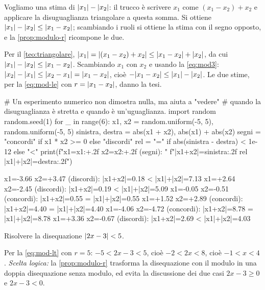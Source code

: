\begin{strategia}
Vogliamo una stima di $\lvert x_{1}\rvert-\lvert x_{2}\rvert$: il trucco è scrivere $x_{1}$ come
$(x_{1}-x_{2})+x_{2}$ e applicare la disuguaglianza triangolare a questa somma. Si
ottiene $\lvert x_{1}\rvert-\lvert x_{2}\rvert\le\lvert x_{1}-x_{2}\rvert$; scambiando i ruoli si ottiene
la stima con il segno opposto, e la \cref{prop:modulo-r} ricompone le due.
\end{strategia}

\begin{dimostrazione}
Per il \cref{teo:triangolare}, $\lvert x_{1}\rvert=\lvert (x_{1}-x_{2})+x_{2}\rvert\le\lvert x_{1}-x_{2}\rvert+\lvert x_{2}\rvert$,
da cui $\lvert x_{1}\rvert-\lvert x_{2}\rvert\le\lvert x_{1}-x_{2}\rvert$. Scambiando $x_{1}$ con $x_{2}$ e
usando la \eqref{eq:mod3}: $\lvert x_{2}\rvert-\lvert x_{1}\rvert\le\lvert x_{2}-x_{1}\rvert=\lvert x_{1}-x_{2}\rvert$,
cioè $-\lvert x_{1}-x_{2}\rvert\le\lvert x_{1}\rvert-\lvert x_{2}\rvert$. Le due stime, per la
\eqref{eq:mod-le} con $r=\lvert x_{1}-x_{2}\rvert$, danno la tesi.
\end{dimostrazione}

\begin{python}
# Un esperimento numerico non dimostra nulla, ma aiuta a "vedere"
# quando la disuguaglianza è stretta e quando è un'uguaglianza.
import random
random.seed(1)
for _ in range(6):
    x1, x2 = random.uniform(-5, 5), random.uniform(-5, 5)
    sinistra, destra = abs(x1 + x2), abs(x1) + abs(x2)
    segni = "concordi" if x1 * x2 >= 0 else "discordi"
    rel = "=" if abs(sinistra - destra) < 1e-12 else "<"
    print(f"x1={x1:+.2f} x2={x2:+.2f} ({segni}): "
          f"|x1+x2|={sinistra:.2f} {rel} |x1|+|x2|={destra:.2f}")
\end{python}
\begin{risultato}
x1=-3.66 x2=+3.47 (discordi): |x1+x2|=0.18 < |x1|+|x2|=7.13
x1=+2.64 x2=-2.45 (discordi): |x1+x2|=0.19 < |x1|+|x2|=5.09
x1=-0.05 x2=-0.51 (concordi): |x1+x2|=0.55 = |x1|+|x2|=0.55
x1=+1.52 x2=+2.89 (concordi): |x1+x2|=4.40 = |x1|+|x2|=4.40
x1=-4.06 x2=-4.72 (concordi): |x1+x2|=8.78 = |x1|+|x2|=8.78
x1=+3.36 x2=-0.67 (discordi): |x1+x2|=2.69 < |x1|+|x2|=4.03
\end{risultato}

\begin{esercizio}
Risolvere la disequazione $\lvert 2x-3\rvert<5$.
\begin{soluzione}
Per la \eqref{eq:mod-lt} con $r=5$: $-5<2x-3<5$, cioè $-2<2x<8$, cioè $-1<x<4$.
\emph{Scelta logica:} la \cref{prop:modulo-r} trasforma la disequazione con il modulo
in una doppia disequazione senza modulo, ed evita la discussione dei due casi
$2x-3\ge0$ e $2x-3<0$.
\end{soluzione}
\end{esercizio}

